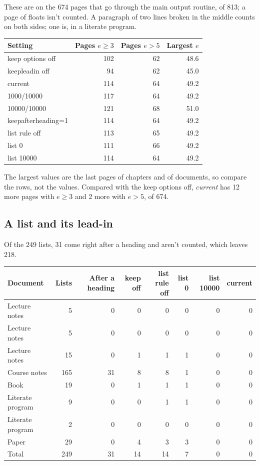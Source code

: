 These are on the 674 pages that go through the main output routine, of 813; a page of floats isn't
counted.
A paragraph of two lines broken in the middle counts on both sides; one is, in a literate program.

\begin{center}\small
\begin{tabular}{@{}lrrr@{}}
\toprule
Setting & Pages $e\ge3$ & Pages $e>5$ & Largest $e$ \\
\midrule
keep options off & 102 & 62 & 48.6 \\
keepleadin off & 94 & 62 & 45.0 \\
current & 114 & 64 & 49.2 \\
1000/10000 & 117 & 64 & 49.2 \\
10000/10000 & 121 & 68 & 51.0 \\
keepafterheading=1 & 114 & 64 & 49.2 \\
list rule off & 113 & 65 & 49.2 \\
list 0 & 111 & 66 & 49.2 \\
list 10000 & 114 & 64 & 49.2 \\
\bottomrule
\end{tabular}
\end{center}

The largest values are the last pages of chapters and of documents, so compare the rows, not the
values.
Compared with the keep options off, \emph{current} has 12 more pages with $e\ge3$ and 2 more with
$e>5$, of 674.

\subsection{A list and its lead-in}

Of the 249 lists, 31 come right after a heading and aren't counted, which leaves 218.

\begin{center}\small
\begin{tabular}{@{}lrrrrrrr@{}}
\toprule
Document & Lists & After a heading & keep off & list rule off & list 0 & list 10000 & current \\
\midrule
Lecture notes & 5 & 0 & 0 & 0 & 0 & 0 & 0 \\
Lecture notes & 5 & 0 & 0 & 0 & 0 & 0 & 0 \\
Lecture notes & 15 & 0 & 1 & 1 & 1 & 0 & 0 \\
Course notes & 165 & 31 & 8 & 8 & 1 & 0 & 0 \\
Book & 19 & 0 & 1 & 1 & 1 & 0 & 0 \\
Literate program & 9 & 0 & 0 & 1 & 1 & 0 & 0 \\
Literate program & 2 & 0 & 0 & 0 & 0 & 0 & 0 \\
Paper & 29 & 0 & 4 & 3 & 3 & 0 & 0 \\
\midrule
Total & 249 & 31 & 14 & 14 & 7 & 0 & 0 \\
\bottomrule
\end{tabular}
\end{center}

